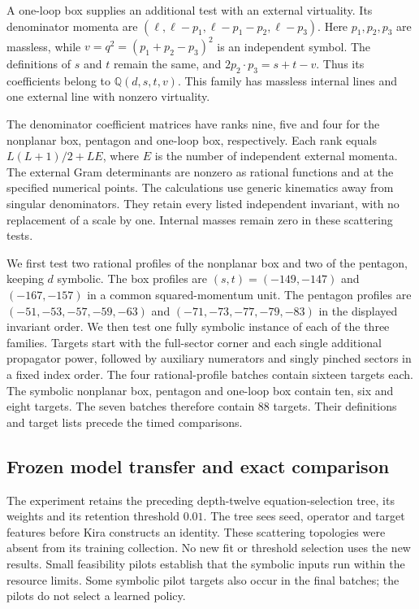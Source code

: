 A one-loop box supplies an additional test with an external virtuality.
Its denominator momenta are
$(\ell,\ell-p_1,\ell-p_1-p_2,\ell-p_3)$.
Here $p_1,p_2,p_3$ are massless, while
$v=q^2=(p_1+p_2-p_3)^2$ is an independent symbol.
The definitions of $s$ and $t$ remain the same, and
$2p_2\cdot p_3=s+t-v$. Thus its coefficients belong to
$\mathbb Q(d,s,t,v)$. This family has massless internal lines and one
external line with nonzero virtuality.

The denominator coefficient matrices have ranks nine, five and four
for the nonplanar box, pentagon and one-loop box, respectively.
Each rank equals $L(L+1)/2+LE$, where $E$ is the number of independent
external momenta. The external Gram determinants are nonzero as
rational functions and at the specified numerical points.
The calculations use generic kinematics away from singular denominators.
They retain every listed independent invariant, with no replacement
of a scale by one. Internal masses remain zero in these scattering tests.

We first test two rational profiles of the nonplanar box and two of the
pentagon, keeping $d$ symbolic. The box profiles are
$(s,t)=(-149,-147)$ and $(-167,-157)$ in a common squared-momentum unit.
The pentagon profiles are
$(-51,-53,-57,-59,-63)$ and $(-71,-73,-77,-79,-83)$ in the displayed
invariant order. We then test one fully symbolic instance of each of
the three families. Targets start with the full-sector corner and
each single additional propagator power, followed by auxiliary
numerators and singly pinched sectors in a fixed index order.
The four rational-profile batches contain sixteen targets each.
The symbolic nonplanar box, pentagon and one-loop box contain ten,
six and eight targets. The seven batches therefore contain 88 targets.
Their definitions and target lists precede the timed comparisons.

\subsection{Frozen model transfer and exact comparison}
The experiment retains the preceding depth-twelve equation-selection
tree, its weights and its retention threshold $0.01$.
The tree sees seed, operator and target features before Kira constructs
an identity. These scattering topologies were absent from its training
collection. No new fit or threshold selection uses the new results.
Small feasibility pilots establish that the symbolic inputs run
within the resource limits. Some symbolic pilot targets also occur in
the final batches; the pilots do not select a learned policy.

